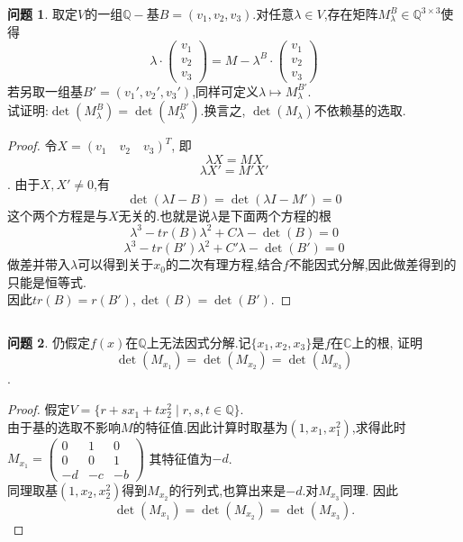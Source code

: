 \documentclass[11pt]{ctexart}
\theoremstyle{definition}
\newtheorem{qqq}{问题}[section]
\numberwithin{equation}{section}
\begin{document}
\[{}\]
\begin{qqq}
    取定$V$的一组$\mathbb{Q}-$基$B=(v_1,v_2,v_3)$.对任意$\lambda\in V$,存在矩阵$M_\lambda^B\in\mathbb{Q}^{3\times 3}$使得
    \begin{equation}
        \lambda\cdot\begin{pmatrix}
            v_1\\v_2\\v_3
        \end{pmatrix}=M-\lambda^B\cdot\begin{pmatrix}
            v_1\\v_2\\v_3
        \end{pmatrix}
    \end{equation}
    若另取一组基$B'=(v_1',v_2',v_3')$,同样可定义$\lambda\mapsto M_\lambda^{B'}$.\\
    试证明:$\det(M_\lambda^{B})=\det(M_\lambda^{B'})$.换言之, $\det(M_\lambda)$不依赖基的选取.
\end{qqq}
\begin{proof}
    令$X=(v_1\quad v_2\quad v_3)^T$,
    即\[\lambda X=MX\]\[\lambda X'=M'X'\].
    由于$X,X'\neq 0$,有\[\det(\lambda I-B)=\det(\lambda I-M')=0\]
    这个两个方程是与$X$无关的.也就是说$\lambda$是下面两个方程的根\
    \[\lambda^3-tr(B)\lambda^2+C\lambda-\det(B)=0\]
    \[\lambda^3-tr(B')\lambda^2+C'\lambda-\det(B')=0\]
    做差并带入$\lambda$可以得到关于$x_0$的二次有理方程,结合$f$不能因式分解,因此做差得到的只能是恒等式.\\
    因此$tr(B)=r(B'),\det(B)=\det(B').$
\end{proof}
\[{}\]
\begin{qqq}
    仍假定$f(x)$在$\mathbb{Q}$上无法因式分解.记$\{x_1,x_2,x_3\}$是$f$在$\mathbb{C}$上的根, 证明$$\det(M_{x_1})=\det(M_{x_2})=\det(M_{x_3})$$.
\end{qqq}
\begin{proof}
    假定$V=\{r+sx_1+tx_2^2\mid r,s,t\in\mathbb{Q}\}$.\\
    由于基的选取不影响$M$的特征值.因此计算时取基为$(1,x_1,x_1^2)$,求得此时$M_{x_1}=
    \begin{pmatrix}
    0&1&0\\0&0&1\\-d&-c&-b
    \end{pmatrix}$
    其特征值为$-d$.\\
    同理取基$(1,x_2,x_2^2)$得到$M_{x_2}$的行列式,也算出来是$-d$.对$M_{x_3}$同理.
    因此$$\det(M_{x_1})=\det(M_{x_2})=\det(M_{x_3}).$$
\end{proof}
\end{document}
